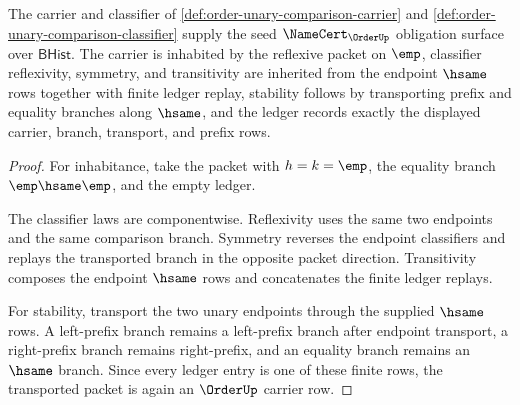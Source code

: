 \begin{theorem}
\label{thm:order-unary-comparison-namecert-obligations}
The carrier and classifier of \autoref{def:order-unary-comparison-carrier} and \autoref{def:order-unary-comparison-classifier} supply the seed $\NameCert_{\OrderUp}$ obligation surface over $\mathsf{BHist}$. The carrier is inhabited by the reflexive packet on $\emp$, classifier reflexivity, symmetry, and transitivity are inherited from the endpoint $\hsame$ rows together with finite ledger replay, stability follows by transporting prefix and equality branches along $\hsame$, and the ledger records exactly the displayed carrier, branch, transport, and prefix rows.
\end{theorem}
\begin{proof}
For inhabitance, take the packet with $h=k=\emp$, the equality branch $\emp\hsame\emp$, and the empty ledger.

The classifier laws are componentwise. Reflexivity uses the same two endpoints and the same comparison branch. Symmetry reverses the endpoint classifiers and replays the transported branch in the opposite packet direction. Transitivity composes the endpoint $\hsame$ rows and concatenates the finite ledger replays.

For stability, transport the two unary endpoints through the supplied $\hsame$ rows. A left-prefix branch remains a left-prefix branch after endpoint transport, a right-prefix branch remains right-prefix, and an equality branch remains an $\hsame$ branch. Since every ledger entry is one of these finite rows, the transported packet is again an $\OrderUp$ carrier row.
\end{proof}


